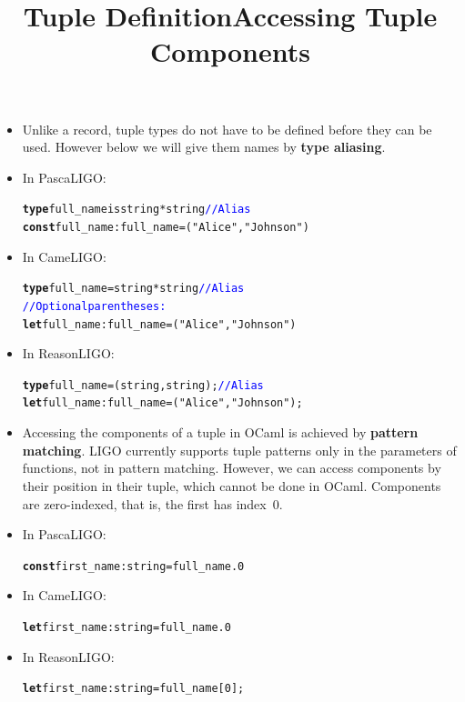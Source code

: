 \documentclass[wide]{slides}
\newcommand{\Kconst}[0]{\textbf{const}\xspace}
\newcommand{\Ktype}[0]{\textbf{type}\xspace}
\newcommand{\Klet}[0]{\textbf{let}\xspace}
\newcommand{\com}[1]{\textcolor{blue}{{#1}}}
\begin{document}
\begin{slide}
  \title{Tuple Definition}

  \begin{itemize}

    \item Unlike a record, tuple types do not have to be defined
      before they can be used. However below we will give them names
      by \textbf{type aliasing}.

    \item In PascaLIGO:
      \begin{alltt}
\Ktype full_name is string * string  \com{// Alias}
\Kconst full_name : full_name = ("Alice", "Johnson")
      \end{alltt}

    \item In CameLIGO:
      \begin{alltt}
\Ktype full_name = string * string  \com{// Alias}
\com{// Optional parentheses:}
\Klet full_name : full_name = ("Alice", "Johnson")
      \end{alltt}

    \item In ReasonLIGO:
      \begin{alltt}
\Ktype full_name = (string, string);  \com{// Alias}
\Klet full_name : full_name = ("Alice", "Johnson");
      \end{alltt}

  \end{itemize}

\end{slide}

\begin{slide}
  \title{Accessing Tuple Components}

  \begin{itemize}

    \item Accessing the components of a tuple in OCaml is achieved by
      \textbf{pattern matching}. LIGO currently supports tuple
      patterns only in the parameters of functions, not in pattern
      matching. However, we can access components by their position in
      their tuple, which cannot be done in OCaml. Components are
      zero-indexed, that is, the first has index~\(0\).

    \item In PascaLIGO:
      \begin{alltt}
\Kconst first_name : string = full_name.0
      \end{alltt}

    \item In CameLIGO:
      \begin{alltt}
\Klet first_name : string = full_name.0
      \end{alltt}

    \item In ReasonLIGO:
      \begin{alltt}
\Klet first_name : string = full_name[0];
      \end{alltt}

  \end{itemize}

\end{slide}
\end{document}

